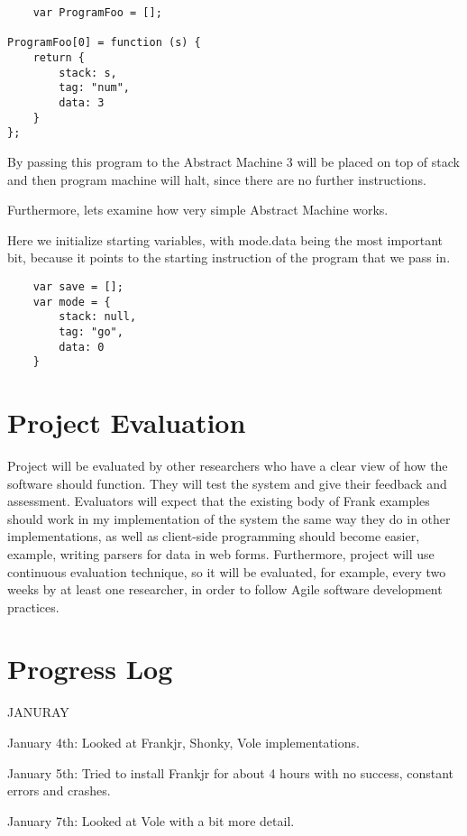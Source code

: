 \documentclass[12pt]{report}
\begin{document}
\begin{lstlisting}
    var ProgramFoo = [];

ProgramFoo[0] = function (s) {
    return {
        stack: s,
        tag: "num",
        data: 3
    }
};

\end{lstlisting}

By passing this program to the Abstract Machine 3 will be placed on top of stack
and then program machine will halt, since there are no further instructions.

Furthermore, lets examine how very simple Abstract Machine works.

Here we initialize starting variables, with mode.data being the most important bit,
because it points to the starting instruction of the program that we pass in.
\begin{lstlisting}
    var save = [];
    var mode = {
        stack: null,
        tag: "go",
        data: 0
    }
\end{lstlisting}

\section{Project Evaluation}

Project will be evaluated by other researchers who have a clear view of how the
software should function. They will test the system and give their feedback and
assessment. Evaluators will expect that the existing body of Frank examples should
work in my implementation of the system the same way they do in other
implementations, as well as client-side programming should become easier, example,
writing parsers for data in web forms. Furthermore, project will use continuous
evaluation technique, so it will be evaluated, for example, every two weeks by at
least one researcher, in order to follow Agile software development practices.  

\section{Progress Log}

JANURAY

January 4th: Looked at Frankjr, Shonky, Vole implementations.

January 5th: Tried to install Frankjr for about 4 hours with no success, constant
errors and crashes.

January 7th: Looked at Vole with a bit more detail.
\end{document}
